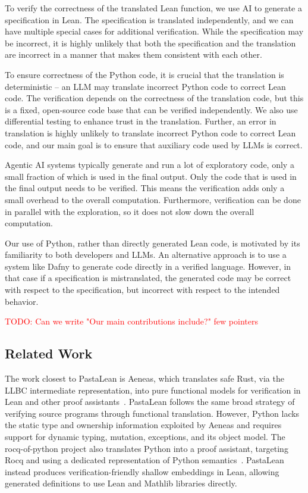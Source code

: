 \documentclass{article}
\newcommand{\todo}[1]{\textcolor{red}{TODO: #1}}
\begin{document}
To verify the correctness of the translated Lean function, we use AI to generate a specification in Lean. The specification is translated independently, and we can have multiple special cases for additional verification. While the specification may be incorrect, it is highly unlikely that both the specification and the translation are incorrect in a manner that makes them consistent with each other.

To ensure correctness of the Python code, it is crucial that the translation is deterministic -- an LLM may translate incorrect Python code to correct Lean code. The verification depends on the correctness of the translation code, but this is a fixed, open-source code base that can be verified independently. We also use differential testing to enhance trust in the translation. Further, an error in translation is highly unlikely to translate incorrect Python code to correct Lean code, and our main goal is to ensure that auxiliary code used by LLMs is correct.

Agentic AI systems typically generate and run a lot of exploratory code, only a small fraction of which is used in the final output. Only the code that is used in the final output needs to be verified. This means the verification adds only a small overhead to the overall computation. Furthermore, verification can be done in parallel with the exploration, so it does not slow down the overall computation.

Our use of Python, rather than directly generated Lean code, is motivated by its familiarity to both developers and LLMs. An alternative approach is to use a system like Dafny to generate code directly in a verified language. However, in that case if a specification is mistranslated, the generated code may be correct with respect to the specification, but incorrect with respect to the intended behavior.

\todo{Can we write "Our main contributions include?" few pointers}

\subsection{Related Work}

The work closest to PastaLean is Aeneas, which translates safe Rust, via the LLBC intermediate representation, into pure functional models for verification in Lean and other proof assistants~\cite{aeneas}. PastaLean follows the same broad strategy of verifying source programs through functional translation. However, Python lacks the static type and ownership information exploited by Aeneas and requires support for dynamic typing, mutation, exceptions, and its object model. The rocq-of-python project also translates Python into a proof assistant, targeting Rocq and using a dedicated representation of Python semantics~\cite{rocq-of-python}. PastaLean instead produces verification-friendly shallow embeddings in Lean, allowing generated definitions to use Lean and Mathlib\cite{mathlib2020} libraries directly.
\end{document}
